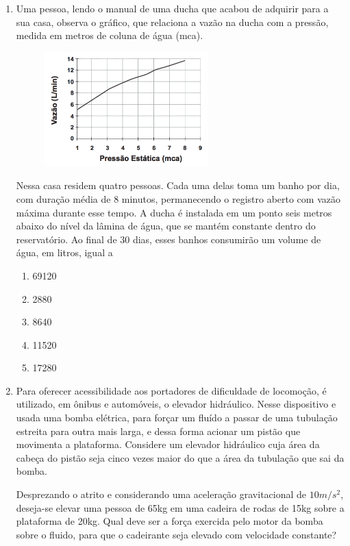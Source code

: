 \documentclass[12pt,letterpaper,fleqn]{article}
\begin{document}
\begin{enumerate}
    \item Uma pessoa, lendo o manual de uma ducha que acabou de adquirir para a sua casa, observa o gráfico, que relaciona a vazão na ducha com a pressão, medida em metros de coluna de água (mca).
    
    \begin{figure}[H]
        \centering
        \includegraphics[width=0.6\textwidth]{ex_1.png}
    \end{figure}
    
    Nessa casa residem quatro pessoas. Cada uma delas toma um banho por dia, com duração média de 8 minutos, permanecendo o registro aberto com vazão máxima durante esse tempo. A ducha é instalada em um ponto seis metros abaixo do nível da lâmina de água, que se mantém constante dentro do reservatório. Ao final de 30 dias, esses banhos consumirão um volume de água, em litros, igual a
    \begin{enumerate}
        \item 69120
        \item 2880
        \item 8640
        \item 11520
        \item 17280
    \end{enumerate}
    
    \item Para oferecer acessibilidade aos portadores de dificuldade de locomoção, é utilizado, em ônibus e automóveis, o elevador hidráulico. Nesse dispositivo e usada uma bomba elétrica, para forçar um fluído a passar de uma tubulação estreita para outra mais larga, e dessa forma acionar um pistão que movimenta a plataforma. Considere um elevador hidráulico cuja área da cabeça do pistão seja cinco vezes maior do que a área da tubulação que sai da bomba.
    
    Desprezando o atrito e considerando uma aceleração gravitacional de $10m/s^2$, deseja-se elevar uma pessoa de 65kg em uma cadeira de rodas de 15kg sobre a plataforma de 20kg. Qual deve ser a força exercida pelo motor da bomba sobre o fluido, para que o cadeirante seja elevado com velocidade constante?
    

\end{enumerate}
\end{document}
